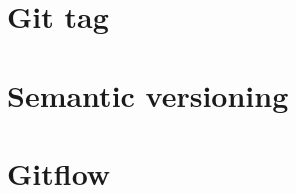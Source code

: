 \documentclass[usenames,svgnames,14pt]{beamer}
\begin{document}
\section{Git tag}
\section{Semantic versioning}
\section{Gitflow}


\end{document}

